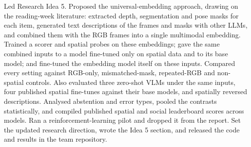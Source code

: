 Led Research Idea 5. Proposed the universal-embedding approach, drawing on the reading-week literature: extracted depth, segmentation and pose masks for each item, generated text descriptions of the frames and masks with other LLMs, and combined them with the RGB frames into a single multimodal embedding. Trained a scorer and spatial probes on these embeddings; gave the same combined inputs to a model fine-tuned only on spatial data and to its base model; and fine-tuned the embedding model itself on these inputs. Compared every setting against RGB-only, mismatched-mask, repeated-RGB and non-spatial controls. Also evaluated three zero-shot VLMs under the same inputs, four published spatial fine-tunes against their base models, and spatially reversed descriptions. Analysed abstention and error types, pooled the contrasts statistically, and compiled published spatial and social leaderboard scores across models. Ran a reinforcement-learning pilot and dropped it from the report. Set the updated research direction, wrote the Idea 5 section, and released the code and results in the team repository.
